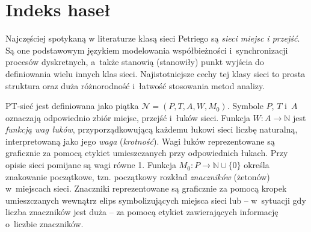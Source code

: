 \documentclass[a4paper,12pt,twoside]{article}
\begin{document}
\section{Indeks haseł}

Najczęściej spotykaną w literaturze klasą sieci Petriego są {\em sieci miejsc i przejść}. Są one podstawowym językiem modelowania współbieżności i~synchronizacji procesów dyskretnych, a~także stanowią (stanowiły) punkt wyjścia do definiowania wielu innych klas sieci. Najistotniejsze cechy tej klasy sieci to prosta struktura oraz duża różnorodność i~łatwość stosowania metod analizy.

PT-sieć jest definiowana jako piątka $\mathcal{N} = (P,T,A,W,M_0)$. Symbole $P$, $T$ i~$A$ oznaczają odpowiednio zbiór miejsc, przejść i~łuków sieci. 
Funkcja $W\colon A\to \mathbb{N}$ jest {\em funkcją wag łuków}, przyporządkowującą każdemu łukowi sieci liczbę naturalną, interpretowaną jako jego {\em waga} ({\em krotność}). Wagi łuków reprezentowane są graficznie za pomocą etykiet umieszczanych przy odpowiednich łukach. Przy opisie sieci pomijane są wagi równe 1. Funkcja $M_0\colon P \to \mathbb{N} \cup \{0\}$ określa znakowanie początkowe, tzn. początkowy rozkład {\em znaczników} (żetonów) w~miejscach sieci. Znaczniki reprezentowane są graficznie za pomocą kropek umieszczanych wewnątrz elips symbolizujących miejsca sieci lub -- w~sytuacji gdy liczba znaczników jest duża -- za pomocą etykiet zawierających informację o~liczbie znaczników. 


\printindex
\end{document}
